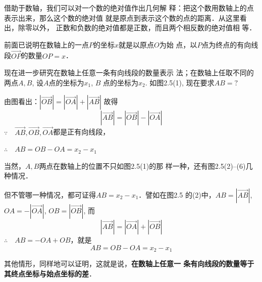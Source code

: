借助于数轴，我们可以对一个数的绝对值作出几何解
释：把这个数用数轴上的点表示出来，那么这个数的绝对值
就是原点到表示这个数的点的距离．从这里看出，除零以外，
正数和负数的绝对值都是正数，而且两个相反数的绝对值相
等．

前面已说明在数轴上的一点$P$的坐标$x$就是以原点$O$为始
点，以$P$点为终点的有向线段$\Vec{OP}$的数量$OP=x$．

现在进一步研究在数轴上任意一条有向线段的数量表示
法；在数轴上任取不同的两点$A,B$, 设$A$点的坐标为$x_1$, $B$
点的坐标为$x_2$. 如图2.5(1), 现在要求$AB=?$

由图看出：$|\Vec{OB}|=|\Vec{OA}|+|\Vec{AB}|$
故得
\[|\Vec{AB}|=|\Vec{OB}|-|\Vec{OA}|\]
$\because\quad \Vec{AB}, \Vec{OB}, \Vec{OA}$都是正有向线段，

$\therefore\quad AB=OB-OA=x_2-x_1$

当然，$A,B$两点在数轴上的位置不只如图2.5(1)的那
样一种，还有图2.5(2)--(6)几种情况．

\begin{figure}[htp]
    \centering
    \caption{}
\end{figure}



但不管哪一种情况，都可证得$AB=x_2-x_1$．譬如在图2.5
的(2)中，$AB=|\Vec{AB}|$, $OA=-|\Vec{OA}|$, $OB=|\Vec{OB}|$, 而
\[|\Vec{AB}|=|\Vec{OA}|+|\Vec{OB}|\]
$\therefore\quad AB=-OA+OB$，就是
\[AB=OB-OA=x_2-x_1\]

其他情形，同样地可以证明，这就是说，\textbf{在数轴上任意一
条有向线段的数量等于其终点坐标与始点坐标的差}．

